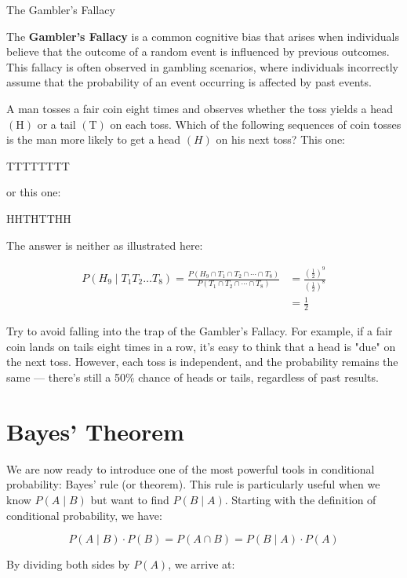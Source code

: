 \begin{example} The Gambler's Fallacy

The \textbf{Gambler's Fallacy }is a common cognitive bias that arises when individuals believe that the outcome of a random event is influenced by previous outcomes. This fallacy is often observed in gambling scenarios, where individuals incorrectly assume that the probability of an event occurring is affected by past events.

A man tosses a fair coin eight times and observes whether the toss yields a head $(\mathrm{H})$ or a tail $(\mathrm{T})$ on each toss. Which of the following sequences of coin tosses is the man more likely to get a head $(H)$ on his next toss? This one:

TTTTTTTT

or this one:

HHTHTTHH

The answer is neither as illustrated here:

\begin{align*}
        P\left(H_9 \mid T_1 T_2 \ldots T_8\right)=\frac{P\left(H_9 \cap T_1 \cap T_2 \cap \cdots \cap T_8\right)}{P\left(T_1 \cap T_2 \cap \cdots \cap T_8\right)} & =\frac{\left(\frac{1}{2}\right)^9}{\left(\frac{1}{2}\right)^8} \\
        & =\frac{1}{2}
\end{align*}
    
\end{example}

Try to avoid falling into the trap of the Gambler's Fallacy. For example, if a fair coin lands on tails eight times in a row, it’s easy to think that a head is "due" on the next toss. However, each toss is independent, and the probability remains the same — there’s still a 50\% chance of heads or tails, regardless of past results.

\section{Bayes' Theorem}
We are now ready to introduce one of the most powerful tools in conditional probability: Bayes' rule (or theorem). This rule is particularly useful when we know \( P(A \mid B) \) but want to find \( P(B \mid A) \). Starting with the definition of conditional probability, we have:

\[
P(A \mid B) \cdot P(B) = P(A \cap B) = P(B \mid A) \cdot P(A)
\]

By dividing both sides by \( P(A) \), we arrive at:

